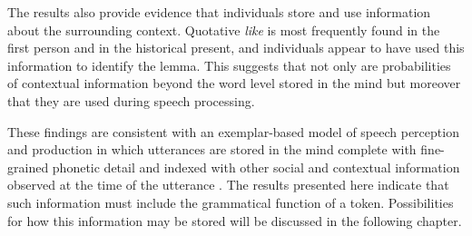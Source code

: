 The results also provide evidence that individuals store and use information about the surrounding context. Quotative \textit{like} is most frequently found in the first person and in the historical present, and individuals appear to have used this information to identify the lemma. This suggests that not only are probabilities of contextual information beyond the word level stored in the mind but moreover that they are used during speech processing. 



These findings are consistent with an exemplar-based model of speech perception and production in which utterances are stored in the mind complete with fine-grained phonetic detail and indexed with other social and contextual information observed at the time of the utterance \citep{johnson1997,pierrehumbert2001,pierrehumbert2002}. The results presented here indicate that such information must include the grammatical function of a token. Possibilities for how this information may be stored will be discussed in the following chapter.





\newpage
\thispagestyle{empty}
\mbox{}